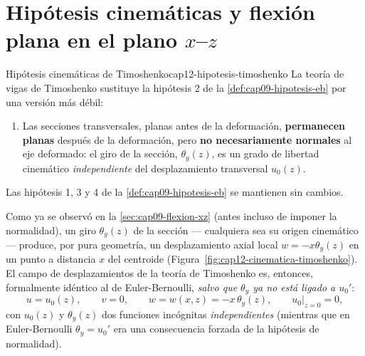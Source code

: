 \section{Hipótesis cinemáticas y flexión plana en el plano \texorpdfstring{$x$--$z$}{x-z}}
\label{sec:cap12-hipotesis}

\begin{definicion}{Hipótesis cinemáticas de Timoshenko}{cap12-hipotesis-timoshenko}
La teoría de vigas de Timoshenko sustituye la hipótesis 2 de la \cref{def:cap09-hipotesis-eb} por una versión más débil:
\begin{enumerate}[leftmargin=1.8em]
  \item[2$'$.] Las secciones transversales, planas antes de la deformación, \textbf{permanecen planas} después de la deformación, pero \textbf{no necesariamente normales} al eje deformado: el giro de la sección, $\theta_y(z)$, es un grado de libertad cinemático \emph{independiente} del desplazamiento transversal $u_0(z)$.
\end{enumerate}
Las hipótesis 1, 3 y 4 de la \cref{def:cap09-hipotesis-eb} se mantienen sin cambios.
\end{definicion}

Como ya se observó en la \cref{sec:cap09-flexion-xz} (antes incluso de imponer la normalidad), un giro $\theta_y(z)$ de la sección --- cualquiera sea su origen cinemático --- produce, por pura geometría, un desplazamiento axial local $w=-x\theta_y(z)$ en un punto a distancia $x$ del centroide (Figura~\ref{fig:cap12-cinematica-timoshenko}). El campo de desplazamientos de la teoría de Timoshenko es, entonces, formalmente idéntico al de Euler-Bernoulli, \emph{salvo que $\theta_y$ ya no está ligado a $u_0'$}:
\[
u=u_0(z), \qquad v=0, \qquad w=w(x,z)=-x\,\theta_y(z), \qquad u_0\big|_{z=0}=0 ,
\]
con $u_0(z)$ y $\theta_y(z)$ dos funciones incógnitas \emph{independientes} (mientras que en Euler-Bernoulli $\theta_y=u_0'$ era una consecuencia forzada de la hipótesis de normalidad).

